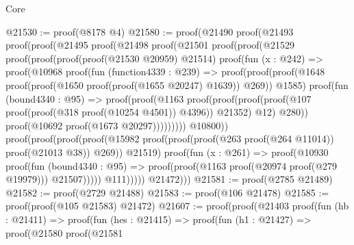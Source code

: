 \begin{lexlean}{Core}
\begin{coremodule}
@21530 := proof(@8178 @4)
@21580 := proof(@21490
      proof(@21493
          proof(proof(@21495
                proof(@21498
                    proof(@21501
                        proof(proof(@21529
                              proof(proof(proof(proof(@21530 @20959) @21514)
                                    proof(fun (x : @242) =>
                                      proof(@10968
                                          proof(fun (function4339 : @239) =>
                                            proof(proof(proof(@1648
                                                    proof(proof(@1650
                                                          proof(proof(@1655 @20247) @1639))
                                                        @269))
                                                  @1585)
                                                proof(fun (bound4340 : @95) =>
                                                  proof(proof(@1163
                                                        proof(proof(proof(proof(@107
                                                                  proof(proof(@318
                                                                        proof(@10254 @4501))
                                                                      @4396))
                                                                @21352)
                                                              @12)
                                                            @280))
                                                      proof(@10692 proof(@1673 @20297)))))))))
                                  @10800))
                            proof(proof(proof(proof(@15982
                                      proof(proof(proof(@263 proof(@264 @11014)) proof(@21013 @38))
                                          @269))
                                    @21519)
                                  proof(fun (x : @261) =>
                                    proof(@10930
                                        proof(fun (bound4340 : @95) =>
                                          proof(proof(@1163 proof(@20974 proof(@279 @19979)))
                                              @21507)))))
                                @111)))))
              @21472)))
@21581 := proof(@2785 @21489)
@21582 := proof(@2729 @21488)
@21583 := proof(@106 @21478)
@21585 := proof(proof(@105 @21583) @21472)
@21607 := proof(proof(@21403
        proof(fun (hb : @21411) =>
          proof(fun (hes : @21415) =>
            proof(fun (h1 : @21427) =>
              proof(@21580
                  proof(@21581

\end{coremodule}
\end{lexlean}
